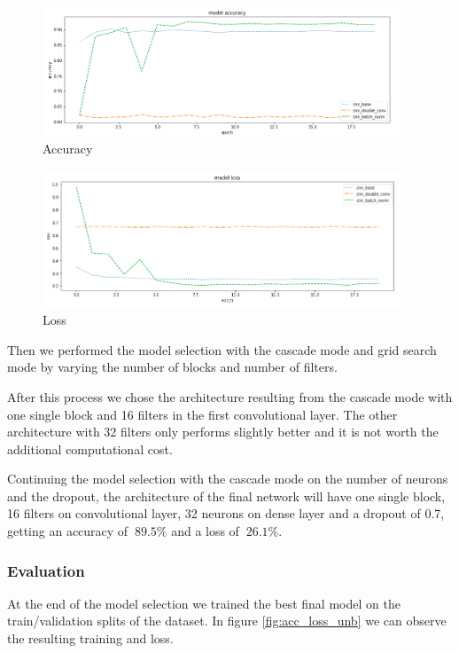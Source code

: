 \documentclass{article}
\begin{document}
\begin{figure}[h]
    \centering
    \includegraphics[width=0.95\textwidth]{images/accuracy_unbalance.png}
    \caption{Accuracy}
    \label{fig:acc_unbalance}
\end{figure}

\begin{figure}[h]
    \centering
    \includegraphics[width=0.95\textwidth]{images/loss_unbalance.png}
    \caption{Loss}
    \label{fig:loss_unbalance}
\end{figure}

Then we performed the model selection with the cascade mode and grid search mode by varying the number of blocks and number of filters. 

After this process we chose the architecture resulting from the cascade mode with one single block and 16 filters in the first convolutional layer. The other architecture with 32 filters only performs slightly better and it is not worth the additional computational cost.

Continuing the model selection with the cascade mode on the number of neurons and the dropout, the architecture of the final network will have one single block, 16 filters on convolutional layer, 32 neurons on dense layer and a dropout of 0.7, getting an accuracy of $~89.5\%$ and a loss of $~26.1\%$.

\subsubsection{Evaluation}
At the end of the model selection we trained the best final model on the train/validation splits of the dataset.
In figure \ref{fig:acc_loss_unb} we can observe the resulting training and loss.
\end{document}
